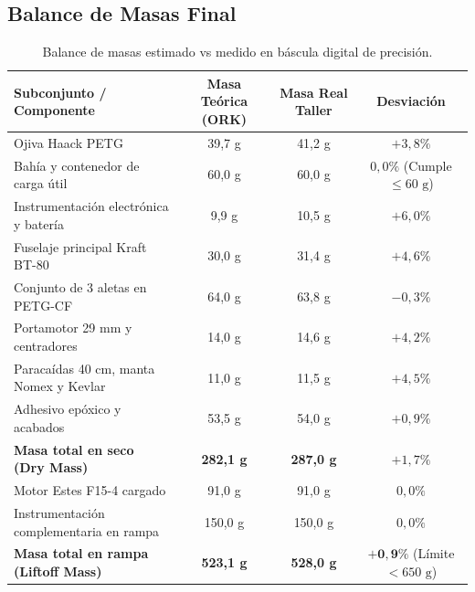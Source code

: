 \subsection{Balance de Masas Final}
\begin{table}[H]
\centering
\small
\begin{tabularx}{\linewidth}{Xccc}
\toprule
\rowcolor{navyiejaga!15}
\textbf{Subconjunto / Componente} & \textbf{Masa Teórica (ORK)} & \textbf{Masa Real Taller} & \textbf{Desviación} \\
\midrule
Ojiva Haack PETG & 39,7 g & 41,2 g & $+3,8\%$ \\
\rowcolor{grisclaro}
Bahía y contenedor de carga útil & 60,0 g & 60,0 g & $0,0\%$ (Cumple $\le 60\text{ g}$) \\
Instrumentación electrónica y batería & 9,9 g & 10,5 g & $+6,0\%$ \\
\rowcolor{grisclaro}
Fuselaje principal Kraft BT-80 & 30,0 g & 31,4 g & $+4,6\%$ \\
Conjunto de 3 aletas en PETG-CF & 64,0 g & 63,8 g & $-0,3\%$ \\
\rowcolor{grisclaro}
Portamotor 29 mm y centradores & 14,0 g & 14,6 g & $+4,2\%$ \\
Paracaídas 40 cm, manta Nomex y Kevlar & 11,0 g & 11,5 g & $+4,5\%$ \\
\rowcolor{grisclaro}
Adhesivo epóxico y acabados & 53,5 g & 54,0 g & $+0,9\%$ \\
\midrule
\textbf{Masa total en seco (Dry Mass)} & \textbf{282,1 g} & \textbf{287,0 g} & $+1,7\%$ \\
\rowcolor{grisclaro}
Motor Estes F15-4 cargado & 91,0 g & 91,0 g & $0,0\%$ \\
Instrumentación complementaria en rampa & 150,0 g & 150,0 g & $0,0\%$ \\
\midrule
\rowcolor{navyiejaga!10}
\textbf{Masa total en rampa (Liftoff Mass)} & \textbf{523,1 g} & \textbf{528,0 g} & $\mathbf{+0,9\%}$ (Límite $< 650\text{ g}$) \\
\bottomrule
\end{tabularx}
\caption{Balance de masas estimado vs medido en báscula digital de precisión.}
\label{tab:balance_masas}
\end{table}
